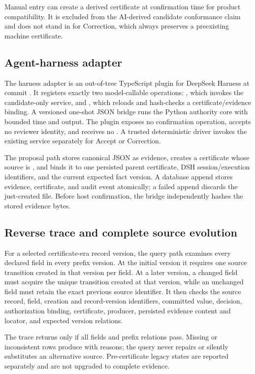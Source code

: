 Manual entry can create a derived certificate at confirmation time for product compatibility. It is excluded from the AI-derived candidate conformance claim and does not stand in for Correction, which always preserves a preexisting machine certificate.

\subsection{Agent-harness adapter}

The harness adapter is an out-of-tree TypeScript plugin for DeepSeek Harness  at commit . It registers exactly two model-callable operations: , which invokes the candidate-only service, and , which reloads and hash-checks a certificate/evidence binding. A versioned one-shot JSON bridge runs the Python authority core with bounded time and output. The plugin exposes no confirmation operation, accepts no reviewer identity, and receives no . A trusted deterministic driver invokes the existing  service separately for Accept or Correction.

The proposal path stores canonical JSON as  evidence, creates a certificate whose source is , and binds it to one persisted parent certificate, DSH session/execution identifiers, and the current expected fact version. A database append stores evidence, certificate, and audit event atomically; a failed append discards the just-created file. Before host confirmation, the bridge independently hashes the stored evidence bytes.

\subsection{Reverse trace and complete source evolution}

For a selected certificate-era record version, the query path examines every declared field in every prefix version. At the initial version it requires one source transition created in that version per field. At a later version, a changed field must acquire the unique transition created at that version, while an unchanged field must retain the exact previous source identifier. It then checks the source record, field, creation and record-version identifiers, committed value, decision, authorization binding, certificate, producer, persisted evidence content and locator, and expected version relations.

The trace returns  only if all fields and prefix relations pass. Missing or inconsistent rows produce  with reasons; the query never repairs or silently substitutes an alternative source. Pre-certificate legacy states are reported separately and are not upgraded to complete evidence.
